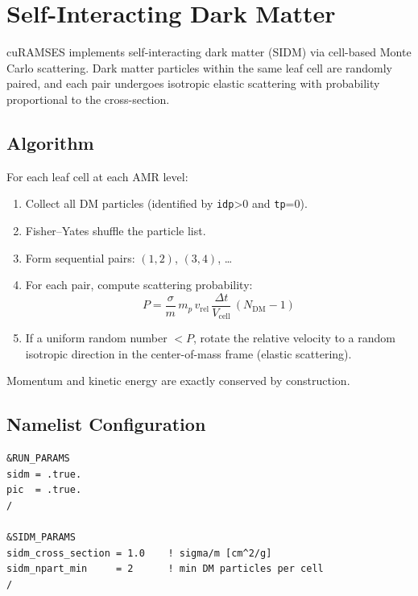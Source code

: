 \documentclass[11pt,fleqn]{book}
\begin{document}
\chapter{Self-Interacting Dark Matter}
\label{ch:sidm}

cuRAMSES implements self-interacting dark matter (SIDM) via cell-based
Monte Carlo scattering.  Dark matter particles within the same leaf cell
are randomly paired, and each pair undergoes isotropic elastic scattering
with probability proportional to the cross-section.

\section{Algorithm}

For each leaf cell at each AMR level:
\begin{enumerate}[nosep]
  \item Collect all DM particles (identified by \texttt{idp}>0 and \texttt{tp}=0).
  \item Fisher--Yates shuffle the particle list.
  \item Form sequential pairs: $(1,2)$, $(3,4)$, \ldots
  \item For each pair, compute scattering probability:
    \[
      P = \frac{\sigma}{m}\,m_p\,v_{\mathrm{rel}}\,\frac{\Delta t}{V_{\mathrm{cell}}}\,(N_{\mathrm{DM}}-1)
    \]
  \item If a uniform random number $< P$, rotate the relative velocity to a random isotropic direction in the center-of-mass frame (elastic scattering).
\end{enumerate}

Momentum and kinetic energy are exactly conserved by construction.

\section{Namelist Configuration}

\begin{codebox}[SIDM example ($\sigma/m = 1\,$cm$^2$/g)]
\begin{lstlisting}[style=fortran,numbers=none]
&RUN_PARAMS
sidm = .true.
pic  = .true.
/

&SIDM_PARAMS
sidm_cross_section = 1.0    ! sigma/m [cm^2/g]
sidm_npart_min     = 2      ! min DM particles per cell
/
\end{lstlisting}
\end{codebox}
\end{document}
